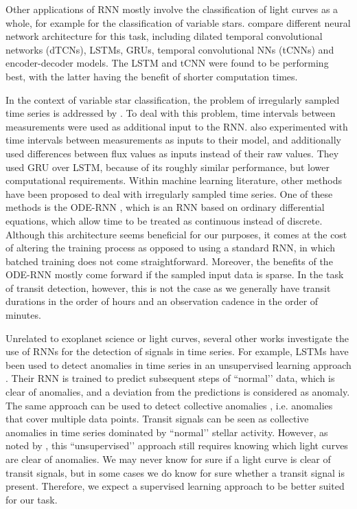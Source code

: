 Other applications of RNN mostly involve the classification of light curves as a whole, for example for the classification of variable stars. \cite{jamal2020neural} compare different neural network architecture for this task, including dilated temporal convolutional networks (dTCNs), LSTMs, GRUs, temporal convolutional NNs (tCNNs) and encoder-decoder models. The LSTM and tCNN were found to be performing best, with the latter having the benefit of shorter computation times. 

In the context of variable star classification, the problem of irregularly sampled time series is addressed by \cite{naul2018recurrent}. To deal with this problem, time intervals between measurements were used as additional input to the RNN. \cite{becker2020scalable} also experimented with time intervals between measurements as inputs to their model, and additionally used differences between flux values as inputs instead of their raw values. They used GRU over LSTM, because of its roughly similar performance, but lower computational requirements. Within machine learning literature, other methods have been proposed to deal with irregularly sampled time series. One of these methods is the ODE-RNN \citep{rubanova2019latent, chen2018neural}, which is an RNN based on ordinary differential equations, which allow time to be treated as continuous instead of discrete. Although this architecture seems beneficial for our purposes, it comes at the cost of altering the training process as opposed to using a standard RNN, in which batched training does not come straightforward. Moreover, the benefits of the ODE-RNN mostly come forward if the sampled input data is sparse. In the task of transit detection, however, this is not the case as we generally have transit durations in the order of hours and an observation cadence in the order of minutes.

Unrelated to exoplanet science or light curves, several other works investigate the use of RNNs for the detection of signals in time series. For example, LSTMs have been used to detect anomalies in time series in an unsupervised learning approach \citep{malhotra2015long}. Their RNN is trained to predict subsequent steps of ``normal’’ data, which is clear of anomalies, and a deviation from the predictions is considered as anomaly. The same approach can be used to detect collective anomalies \citep{bontemps2016collective}, i.e. anomalies that cover multiple data points. Transit signals can be seen as collective anomalies in time series dominated by ``normal’’ stellar activity. However, as noted by \cite{cherdo2020training}, this ``unsupervised’’ approach still requires knowing which light curves are clear of anomalies. We may never know for sure if a light curve is clear of transit signals, but in some cases we do know for sure whether a transit signal is present. Therefore, we expect a supervised learning approach to be better suited for our task.



